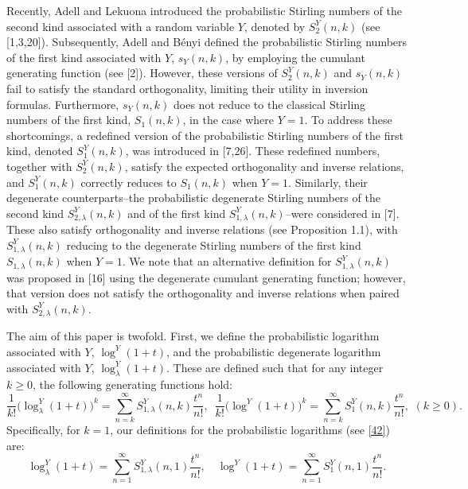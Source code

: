 \documentclass[a4paper,11pt]{amsart}
\begin{document}
Recently, Adell and Lekuona introduced the probabilistic Stirling numbers of the second kind associated with a random variable $Y$, denoted by $S_{2}^{Y}(n,k)$ (see [1,3,20]). Subsequently, Adell and B\'{e}nyi defined the probabilistic Stirling numbers of the first kind associated with $Y$, $s_{Y}(n,k)$, by employing the cumulant generating function (see [2]). However, these versions of $S_{2}^{Y}(n,k)$ and $s_{Y}(n,k)$ fail to satisfy the standard orthogonality, limiting their utility in inversion formulas. Furthermore, $s_{Y}(n,k)$ does not reduce to the classical Stirling numbers of the first kind, $S_{1}(n,k)$, in the case where $Y=1$. To address these shortcomings, a redefined version of the probabilistic Stirling numbers of the first kind, denoted $S_{1}^{Y}(n,k)$, was introduced in [7,26]. These redefined numbers, together with $S_{2}^{Y}(n,k)$, satisfy the expected orthogonality and inverse relations, and $S_{1}^{Y}(n,k)$ correctly reduces to $S_{1}(n,k)$ when $Y=1$. Similarly, their degenerate counterparts--the probabilistic degenerate Stirling numbers of the second kind $S_{2,\lambda}^{Y}(n,k)$ and of the first kind $S_{1,\lambda}^{Y}(n,k)$--were considered in [7]. These also satisfy orthogonality and inverse relations (see Proposition 1.1), with $S_{1,\lambda}^{Y}(n,k)$ reducing to the degenerate Stirling numbers of the first kind $S_{1,\lambda}(n,k)$ when $Y=1$. We note that an alternative definition for $S_{1,\lambda}^{Y}(n,k)$ was proposed in [16] using the degenerate cumulant generating function; however, that version does not satisfy the orthogonality and inverse relations when paired with $S_{2,\lambda}^{Y}(n,k)$. \par
The aim of this paper is twofold. First, we define the probabilistic logarithm associated with $Y$, $\log^{Y}(1+t)$, and the probabilistic degenerate logarithm associated with $Y$, $\log_{\lambda}^{Y}(1+t)$. These are defined such that for any integer $k \ge 0$, the following generating functions hold:
\begin{equation*}
\frac{1}{k!}\Big(\log_{\lambda}^{Y}(1+t)\Big)^{k}=\sum_{n=k}^{\infty}S_{1,\lambda}^{Y}(n,k)\frac{t^{n}}{n!}, \,\,\, \frac{1}{k!}\Big(\log^{Y}(1+t)\Big)^{k}=\sum_{n=k}^{\infty}S_{1}^{Y}(n,k)\frac{t^{n}}{n!},\,\, (k \ge 0).
\end{equation*}
Specifically, for $k=1$, our definitions for the probabilistic logarithms (see \eqref{42}) are:
\begin{equation*}
\log_{\lambda}^{Y}(1+t)=\sum_{n=1}^{\infty}S_{1,\lambda}^{Y}(n,1)\frac{t^{n}}{n!}, \quad \log^{Y}(1+t)=\sum_{n=1}^{\infty}S_{1}^{Y}(n,1)\frac{t^{n}}{n!}.
\end{equation*}
\end{document}

